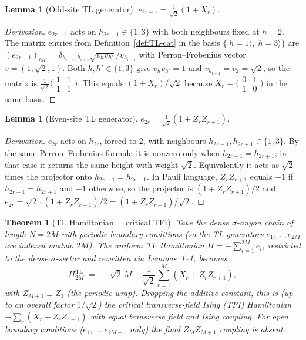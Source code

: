 \documentclass[11pt,a4paper]{article}
\newtheorem{lemma}[definition]{Lemma}
\newtheorem{theorem}[definition]{Theorem}
\theoremstyle{definition}
\begin{document}
\begin{lemma}[Odd-site TL generator]\label{lem:e-odd}
$e_{2r-1} = \frac{1}{\sqrt 2}(1+X_r)$.
\end{lemma}
\begin{proof}[Derivation]
$e_{2r-1}$ acts on $h_{2r-1}\in\{1,3\}$ with both neighbours fixed at $h=2$.
The matrix entries from Definition~\ref{def:TL-cat} in the basis $\{|h=1\rangle,|h=3\rangle\}$
are $(e_{2r-1})_{hh'} = \delta_{h_{i-1},h_{i+1}}\sqrt{v_h v_{h'}}/v_{h_{i-1}}$
with Perron--Frobenius vector $v=(1,\sqrt 2,1)$. Both $h,h'\in\{1,3\}$ give
$v_h v_{h'}=1$ and $v_{h_{i-1}}=v_2=\sqrt 2$, so the matrix is
$\frac{1}{\sqrt 2}\bigl(\begin{smallmatrix}1&1\\1&1\end{smallmatrix}\bigr)$.
This equals $(1+X_r)/\sqrt 2$ because $X_r=\bigl(\begin{smallmatrix}0&1\\1&0\end{smallmatrix}\bigr)$ in the same basis.
\end{proof}

\begin{lemma}[Even-site TL generator]\label{lem:e-even}
$e_{2r} = \frac{1}{\sqrt 2}(1 + Z_r Z_{r+1})$.
\end{lemma}
\begin{proof}[Derivation]
$e_{2r}$ acts on $h_{2r}$, forced to $2$, with neighbours
$h_{2r-1},h_{2r+1}\in\{1,3\}$. By the same Perron--Frobenius formula it is
nonzero only when $h_{2r-1}=h_{2r+1}$; in that case it returns the same
height with weight $\sqrt 2$. Equivalently it acts as $\sqrt 2$ times the
projector onto $h_{2r-1}=h_{2r+1}$. In Pauli language,
$Z_rZ_{r+1}$ equals $+1$ if $h_{2r-1}=h_{2r+1}$ and $-1$ otherwise, so the
projector is $(1+Z_rZ_{r+1})/2$ and $e_{2r}=\sqrt 2\cdot(1+Z_rZ_{r+1})/2
=(1+Z_rZ_{r+1})/\sqrt 2$.
\end{proof}

\begin{theorem}[TL Hamiltonian = critical TFI]\label{thm:TFI}
Take the dense $\sigma$-anyon chain of length $N = 2M$ with periodic
boundary conditions (so the TL generators $e_1,\dots,e_{2M}$ are indexed
modulo $2M$). The uniform TL Hamiltonian $H = -\sum_{i=1}^{2M} e_i$,
restricted to the dense $\sigma$-sector and rewritten via
Lemmas~\ref{lem:e-odd}--\ref{lem:e-even}, becomes
\[
H_{2M}^{\mathrm{TL}} \;=\;
-\sqrt 2\,M - \frac{1}{\sqrt 2}\sum_{r=1}^{M}(X_r + Z_r Z_{r+1}),
\]
with $Z_{M+1} \equiv Z_1$ (the periodic wrap). Dropping the additive
constant, this is (up to an overall factor $1/\sqrt 2$) the critical
\emph{transverse-field Ising} (TFI) Hamiltonian
$-\sum_{r}(X_r + Z_r Z_{r+1})$ with equal transverse field and Ising
coupling. For open boundary conditions ($e_1,\dots,e_{2M-1}$ only) the
final $Z_M Z_{M+1}$ coupling is absent.
\end{theorem}
\end{document}
